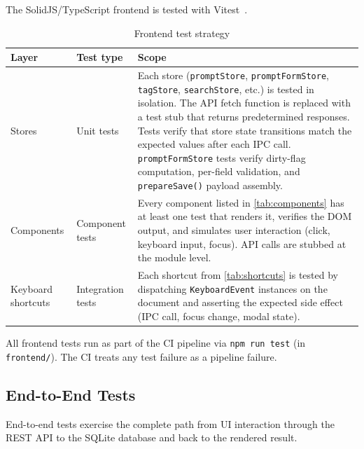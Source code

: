 \documentclass[a4paper, 11pt, oneside]{report}
\begin{document}
The SolidJS/TypeScript frontend is tested with
Vitest~\cite{vitest}.

\begin{table}[H]
  \centering
  \caption{Frontend test strategy}
  \label{tab:frontend-testing}
  \begin{tabularx}{\textwidth}{l l X}
    \toprule
    \textbf{Layer} & \textbf{Test type} & \textbf{Scope} \\
    \midrule
    Stores          & Unit tests &
      Each store (\texttt{promptStore}, \texttt{promptFormStore},
      \texttt{tagStore}, \texttt{searchStore}, etc.) is tested in
      isolation.  The API fetch function is replaced with a test
      stub that returns predetermined responses.  Tests verify that
      store state transitions match the expected values after each IPC
      call.  \texttt{promptFormStore} tests verify dirty-flag computation,
      per-field validation, and \texttt{prepareSave()} payload
      assembly. \\
    Components      & Component tests &
      Every component listed in \cref{tab:components} has at least
      one test that renders it, verifies the DOM output, and
      simulates user interaction (click, keyboard input, focus).
      API calls are stubbed at the module level. \\
    Keyboard shortcuts & Integration tests &
      Each shortcut from \cref{tab:shortcuts} is tested by
      dispatching \texttt{KeyboardEvent} instances on the
      document and asserting the expected side effect (IPC call,
      focus change, modal state). \\
    \bottomrule
  \end{tabularx}
\end{table}

All frontend tests run as part of the CI pipeline via
\texttt{npm run test} (in \texttt{frontend/}).  The CI treats any test
failure as a pipeline failure.

\subsection{End-to-End Tests}
\label{sec:e2e-tests}

End-to-end tests exercise the complete path from UI interaction through
the REST API to the SQLite database and back to the rendered result.
\end{document}
